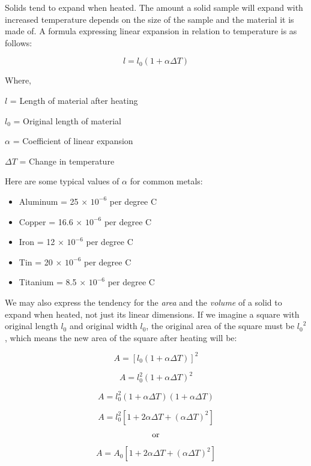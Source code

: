 

Solids tend to expand when heated.  The amount a solid sample will expand with increased temperature depends on the size of the sample and the material it is made of.  A formula expressing linear expansion in relation to temperature is as follows:

$$l = l_0 (1 + \alpha \Delta T)$$

\noindent
Where,

$l$ = Length of material after heating

$l_0$ = Original length of material

$\alpha$ = Coefficient of linear expansion 

$\Delta T$ = Change in temperature

\vskip 10pt

Here are some typical values of $\alpha$ for common metals:

\begin{itemize}
\item{} Aluminum = 25 $\times$ $10^{-6}$ per degree C
\item{} Copper = 16.6 $\times$ $10^{-6}$ per degree C
\item{} Iron = 12 $\times$ $10^{-6}$ per degree C
\item{} Tin = 20 $\times$ $10^{-6}$ per degree C
\item{} Titanium = 8.5 $\times$ $10^{-6}$ per degree C
\end{itemize}

We may also express the tendency for the {\it area} and the {\it volume} of a solid to expand when heated, not just its linear dimensions.  If we imagine a square with original length $l_0$ and original width $l_0$, the original area of the square must be ${l_0}^2$, which means the new area of the square after heating will be:

$$A = [l_0 (1 + \alpha \Delta T)]^2$$

$$A = l_0^2 (1 + \alpha \Delta T)^2$$

$$A = l_0^2 (1 + \alpha \Delta T)(1 + \alpha \Delta T)$$

$$A = l_0^2 [1 + 2 \alpha \Delta T + (\alpha \Delta T)^2]$$

$$\hbox{or}$$

$$A = A_0 [1 + 2 \alpha \Delta T + (\alpha \Delta T)^2]$$

